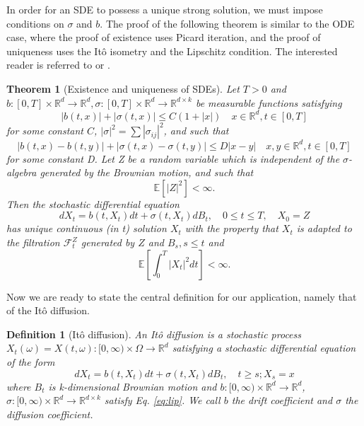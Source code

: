 \documentclass[12pt]{article}
\theoremstyle{break}
\newtheorem{definition}{Definition}[section]
\newtheorem{theorem}{Theorem}[section]
\begin{document}
In order for an SDE to possess a unique strong solution, we must impose conditions on $\sigma$ and $b$. The proof of the following theorem is similar to the ODE case, where the proof of existence uses Picard iteration, and the proof of uniqueness uses the Itô isometry and the Lipschitz condition. The interested reader is referred to \cite{oksendal2013} or \cite{karatzas1998}.

\begin{theorem}[Existence and uniqueness of SDEs]
	\label{thm:existence}
	Let $T>0$ and $b:[0,T] \times \mathbb{R}^d \to \mathbb{R}^d, \sigma:[0, T] \times \mathbb{R}^d \to \mathbb{R}^{d \times k}$ be measurable functions satisfying
	\begin{equation}
		|b(t, x)| + |\sigma(t, x)| \leq C(1 + |x|) \quad x\in\mathbb{R}^d, t\in [0,T]
	\end{equation}
	for some constant $C$, $|\sigma|^2 = \sum|\sigma_{ij}|^2$, and such that
	\begin{equation}
		|b(t, x) - b(t,y)| + |\sigma(t,x)-\sigma(t,y)| \leq D|x-y| \quad x,y\in \mathbb{R}^d, t\in[0,T]
		\label{eq:lip}
	\end{equation}
	for some constant D. Let Z be a random variable which is independent of the $\sigma$-algebra generated by the Brownian motion, and such that
	\begin{equation}
		\mathbb{E}[|Z|^2] < \infty.
	\end{equation}
	Then the stochastic differential equation 
	\begin{equation}
		dX_t = b(t, X_t)dt + \sigma(t, X_t)dB_t, \quad 0 \leq t \leq T, \quad X_0 = Z
	\end{equation}
	has unique continuous (in t) solution $X_t$ with the property that $X_t$ is adapted to the filtration $\mathcal{F}_t^Z$ generated by $Z$ and $B_s, s \leq t$ and
	\begin{equation}
		\mathbb{E}\left[ \int_0^T |X_t|^2 dt\right] < \infty.
	\end{equation}

\end{theorem}

Now we are ready to state the central definition for our application, namely that of the Itô diffusion.

\begin{definition}[Itô diffusion]
	An Itô diffusion is a stochastic process $X_t(\omega) = X(t,\omega):[0,\infty) \times \Omega \to \mathbb{R}^d$ satisfying a stochastic differential equation of the form
	\begin{equation*}
		dX_t = b(t, X_t)dt + \sigma(t, X_t)dB_t, \quad t \geq s; X_s = x
	\end{equation*}
	where $B_t$ is k-dimensional Brownian motion and $b:[0, \infty) \times \mathbb{R}^d \to \mathbb{R}^d$, $\sigma:[0, \infty) \times \mathbb{R}^d \to \mathbb{R}^{d \times k}$ satisfy Eq. \ref{eq:lip}. We call $b$ the drift coefficient and $\sigma$ the diffusion coefficient.
\end{definition}
\end{document}
